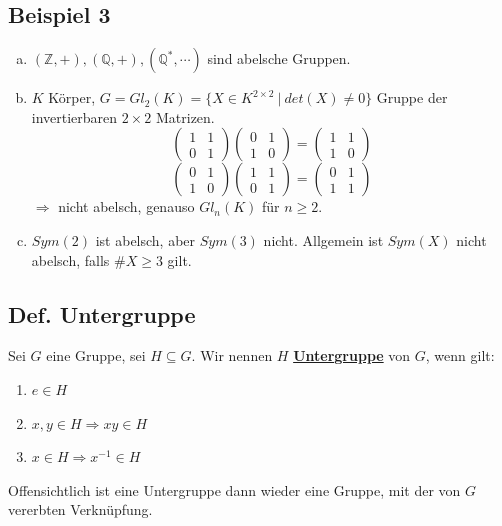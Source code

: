 \documentclass[a4paper, pagesize=pdftex, pdftex, twoside, headsepline, index=totoc,toc=listof, fontsize=10pt, cleardoublepage=empty, headinclude, DIV=13, BCOR=13mm]{scrartcl}
\newcommand{\bet}[1]{\uline{\textbf{#1}}} %
\begin{document}
\subsection{Beispiel 3}
\label{sub: beispiel_3}
\begin{enumerate}[(a)]
	\item $(\mathds{Z}, +), (\mathds{Q}, +), (\mathds{Q}^*,\cdots)$ sind abelsche Gruppen.
	\item $K$ Körper, $G=Gl_2(K)=\{X \in K^{2\times 2}~ |~ det(X)\not= 0 \}$ Gruppe der invertierbaren $2 \times 2$ Matrizen.\\
\[
	\begin{pmatrix}	1 & 1\\ 0 & 1 \end{pmatrix}
	\begin{pmatrix} 0 & 1\\	1 & 0 \end{pmatrix}
	=
	\begin{pmatrix}	1 & 1\\	1 & 0 \end{pmatrix}
\]
\[
	\begin{pmatrix} 0 & 1\\	1 & 0 \end{pmatrix}
	\begin{pmatrix} 1 & 1\\ 0 & 1 \end{pmatrix}
	=
	\begin{pmatrix} 0 & 1\\ 1 & 1 \end{pmatrix}
\]
	$\Rightarrow$ nicht abelsch, genauso $Gl_n(K)$ für $n\ge 2$.
	\item $Sym(2)$ ist abelsch, aber $Sym(3)$ nicht. Allgemein ist $Sym(X)$ nicht abelsch, falls $\#X \ge 3$ gilt.
\end{enumerate}

\subsection{Def. Untergruppe}
\label{sub: def_untergruppe}
Sei $G$ eine Gruppe, sei $H\subseteq G$. Wir nennen $H$ \bet{Untergruppe}  von $G$, wenn gilt:
\begin{enumerate}[(UG1)]
	\item $e\in H$
	\item $x,y\in H \Rightarrow xy\in H$
	\item $x\in H \Rightarrow x^{-1} \in H$
\end{enumerate}
Offensichtlich ist eine Untergruppe dann wieder eine Gruppe, mit der von $G$ vererbten Verknüpfung.
\end{document}
